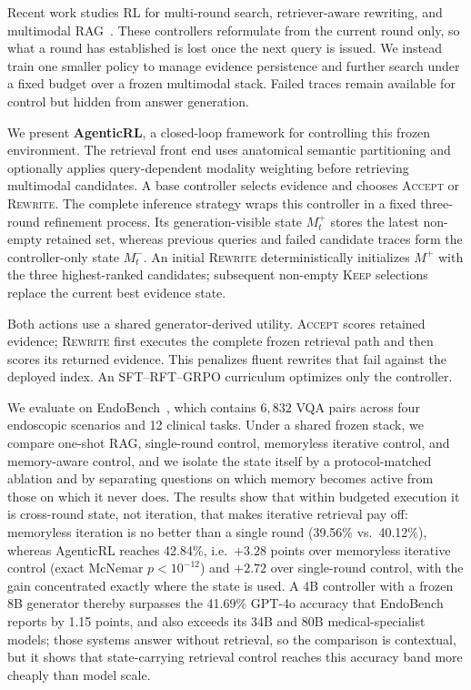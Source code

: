 Recent work studies RL for multi-round search, retriever-aware rewriting, and
multimodal RAG~\cite{jin2025searchr1,song2025r1searcher,li2026ttr,
lin2026craf,zhao2026mmragrft}. These controllers reformulate from the current
round only, so what a round has established is lost once the next query is
issued. We instead train one smaller policy to manage evidence persistence and
further search under a fixed budget over a frozen multimodal stack. Failed
traces remain available for control but hidden from answer generation.

We present \textbf{AgenticRL}, a closed-loop framework for controlling this
frozen environment. The retrieval front end uses anatomical semantic
partitioning and optionally applies query-dependent modality weighting before
retrieving multimodal candidates. A base controller selects evidence and
chooses \textsc{Accept} or \textsc{Rewrite}. The complete inference strategy
wraps this controller in a fixed three-round refinement process. Its
generation-visible state $M_t^+$ stores the latest non-empty retained set,
whereas previous queries and failed candidate traces form the controller-only
state $M_t^-$. An initial \textsc{Rewrite} deterministically initializes
$M^+$ with the three highest-ranked candidates; subsequent non-empty
\textsc{Keep} selections replace the current best evidence state.

Both actions use a shared generator-derived utility. \textsc{Accept} scores
retained evidence; \textsc{Rewrite} first executes the complete frozen
retrieval path and then scores its returned evidence. This penalizes fluent
rewrites that fail against the deployed index. An SFT--RFT--GRPO curriculum
optimizes only the controller.

We evaluate on EndoBench~\cite{liu2025endobench}, which contains $6{,}832$ VQA
pairs across four endoscopic scenarios and 12 clinical tasks. Under a shared
frozen stack, we compare one-shot RAG, single-round control, memoryless
iterative control, and memory-aware control, and we isolate the state itself
by a protocol-matched ablation and by separating questions on which memory
becomes active from those on which it never does. The results show that within
budgeted execution it is cross-round state, not iteration, that makes iterative
retrieval pay off: memoryless iteration is no better than a single round
(39.56\% vs.\ 40.12\%), whereas AgenticRL reaches 42.84\%, i.e.\ $+3.28$
points over memoryless iterative control (exact McNemar $p<10^{-12}$) and
$+2.72$ over single-round control, with the gain concentrated exactly where the
state is used. A 4B controller with a frozen 8B generator thereby surpasses the
41.69\% GPT-4o accuracy that EndoBench reports by 1.15 points, and also exceeds
its 34B and 80B medical-specialist models; those systems answer without
retrieval, so the comparison is contextual, but it shows that state-carrying
retrieval control reaches this accuracy band more cheaply than model scale.

